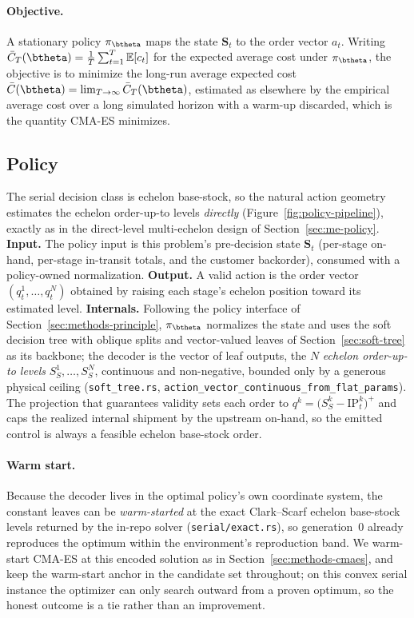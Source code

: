 \paragraph{Objective.}
A stationary policy $\pi_{\btheta}$ maps the state $\mathbf S_t$ to the order vector $a_t$. Writing
$\bar C_T(\btheta)=\tfrac1T\sum_{t=1}^{T}\mathbb E[c_t]$ for the expected average cost under
$\pi_{\btheta}$, the objective is to minimize the long-run average expected cost
$\bar C(\btheta)=\lim_{T\to\infty}\bar C_T(\btheta)$, estimated as elsewhere by the empirical average
cost over a long simulated horizon with a warm-up discarded, which is the quantity CMA-ES minimizes.

\FloatBarrier

\subsection{Policy}
\label{sec:serial-policy}

The serial decision class is echelon base-stock, so the natural action geometry estimates the echelon
order-up-to levels \emph{directly} (Figure~\ref{fig:policy-pipeline}), exactly as in the
direct-level multi-echelon design of Section~\ref{sec:me-policy}. \textbf{Input.} The policy input is
this problem's pre-decision state $\mathbf S_t$ (per-stage on-hand, per-stage in-transit totals, and
the customer backorder), consumed with a policy-owned normalization. \textbf{Output.} A valid action
is the order vector $(q^1_t,\dots,q^N_t)$ obtained by raising each stage's echelon position toward its
estimated level. \textbf{Internals.} Following the policy interface of
Section~\ref{sec:methods-principle}, $\pi_{\btheta}$ normalizes the state and uses the soft decision
tree with oblique splits and vector-valued leaves of Section~\ref{sec:soft-tree} as its backbone; the
decoder is the vector of leaf outputs, the $N$ \emph{echelon order-up-to levels} $S^1_S,\dots,S^N_S$,
continuous and non-negative, bounded only by a generous physical ceiling
(\texttt{soft\_tree.rs}, \texttt{action\_vector\_continuous\_from\_flat\_params}). The projection that
guarantees validity sets each order to $q^k=\big(S^k_S-\mathrm{IP}^k_t\big)^+$ and caps the realized
internal shipment by the upstream on-hand, so the emitted control is always a feasible echelon
base-stock order.

\paragraph{Warm start.}
Because the decoder lives in the optimal policy's own coordinate system, the constant leaves can be
\emph{warm-started} at the exact Clark--Scarf echelon base-stock levels returned by the in-repo solver
(\texttt{serial/exact.rs}), so generation~$0$ already reproduces the optimum within the environment's
reproduction band. We warm-start CMA-ES at this encoded solution as in
Section~\ref{sec:methods-cmaes}, and keep the warm-start anchor in the candidate set throughout; on
this convex serial instance the optimizer can only search outward from a proven optimum, so the honest
outcome is a tie rather than an improvement.

